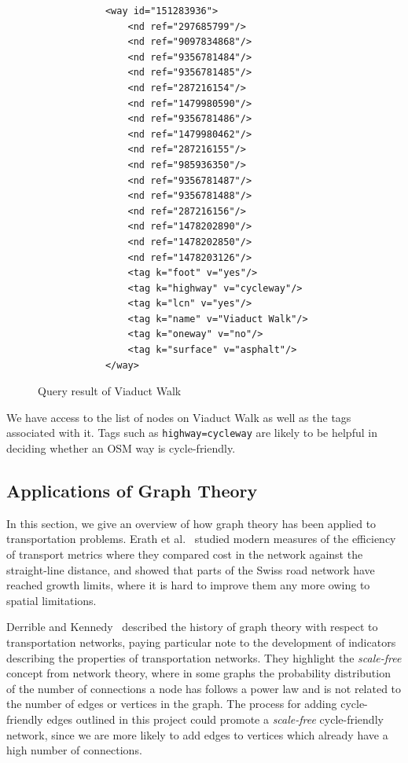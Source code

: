 \documentclass[12pt,a4paper]{report}
\begin{document}
\begin{figure}[ht]
    \centering
    \begin{minipage}[c]{\textwidth}
        \begin{verbatim}
            <way id="151283936">
                <nd ref="297685799"/>
                <nd ref="9097834868"/>
                <nd ref="9356781484"/>
                <nd ref="9356781485"/>
                <nd ref="287216154"/>
                <nd ref="1479980590"/>
                <nd ref="9356781486"/>
                <nd ref="1479980462"/>
                <nd ref="287216155"/>
                <nd ref="985936350"/>
                <nd ref="9356781487"/>
                <nd ref="9356781488"/>
                <nd ref="287216156"/>
                <nd ref="1478202890"/>
                <nd ref="1478202850"/>
                <nd ref="1478203126"/>
                <tag k="foot" v="yes"/>
                <tag k="highway" v="cycleway"/>
                <tag k="lcn" v="yes"/>
                <tag k="name" v="Viaduct Walk"/>
                <tag k="oneway" v="no"/>
                <tag k="surface" v="asphalt"/>
            </way>
        \end{verbatim}
    \end{minipage}
    \caption{Query result of Viaduct Walk}
    \label{fig:query}
\end{figure}

We have access to the list of nodes on Viaduct Walk as well as the tags associated with it. Tags such as \texttt{highway=cycleway} are likely to be helpful in deciding whether an OSM way is cycle-friendly.

\subsection{Applications of Graph Theory}
In this section, we give an overview of how graph theory has been applied to transportation problems. Erath et al.~\cite{erath2009} studied modern measures of the efficiency of transport metrics where they compared cost in the network against the straight-line distance, and showed that parts of the Swiss road network have reached growth limits, where it is hard to improve them any more owing to spatial limitations.

Derrible and Kennedy~\cite{derrible2011} described the history of graph theory with respect to transportation networks, paying particular note to the development of indicators describing the properties of transportation networks. They highlight the \textit{scale-free} concept from network theory, where in some graphs the probability distribution of the number of connections a node has follows a power law and is not related to the number of edges or vertices in the graph. The process for adding cycle-friendly edges outlined in this project could promote a \textit{scale-free} cycle-friendly network, since we are more likely to add edges to vertices which already have a high number of connections. 
\end{document}

